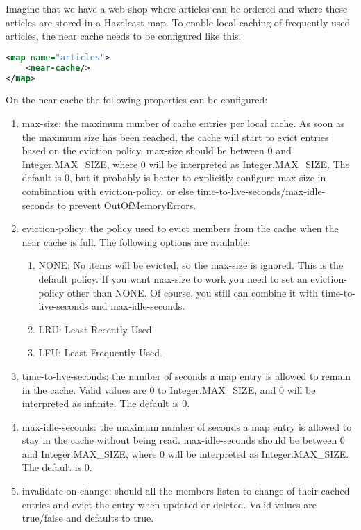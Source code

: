 Imagine that we have a web-shop where articles can be ordered and where these articles are stored in a Hazelcast map. To enable local caching of frequently used articles, the near cache needs to be configured like this:
\begin{lstlisting}[language=xml]
<map name="articles">
    <near-cache/>
</map>
\end{lstlisting}
On the near cache the following properties can be configured:
\begin{enumerate}
\item max-size: the maximum number of cache entries per local cache. As soon as the maximum size has been reached, the cache will start to evict entries based on the eviction policy. max-size should be between 0 and Integer.MAX\_SIZE, where 0 will be interpreted as Integer.MAX\_SIZE. The default is 0, but it probably is better to explicitly configure max-size in combination with eviction-policy, or else time-to-live-seconds/max-idle-seconds to prevent OutOfMemoryErrors.
\item eviction-policy: the policy used to evict members from the cache when the near cache is full. The following options are available:
\begin{enumerate}
 \item NONE: No items will be evicted, so the max-size is ignored. This is the default policy. If you want max-size to work you need to set an eviction-policy other than NONE. Of course, you still can combine it with time-to-live-seconds and  max-idle-seconds.
 \item LRU: Least Recently Used
 \item LFU: Least Frequently Used.
\end{enumerate}
\item time-to-live-seconds: the number of seconds a map entry is allowed to remain in the cache. Valid values are 0 to Integer.MAX\_SIZE, and 0 will be interpreted as infinite. The default is 0.
\item max-idle-seconds: the maximum number of seconds a map entry is allowed to stay in the cache without being read. max-idle-seconds should be between 0 and Integer.MAX\_SIZE, where 0 will be interpreted as Integer.MAX\_SIZE. The default is 0. 
\item invalidate-on-change: should all the members listen to change of their cached entries and evict the entry when updated or deleted. Valid values are true/false and defaults to true. 
\end{enumerate}

